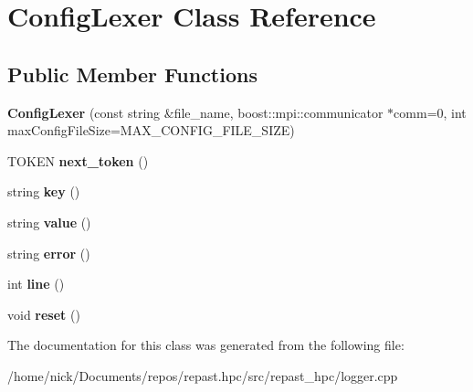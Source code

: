 \hypertarget{class_config_lexer}{\section{Config\-Lexer Class Reference}
\label{class_config_lexer}
}
\subsection*{Public Member Functions}
\begin{DoxyCompactItemize}
\item 
\hypertarget{class_config_lexer_a046cf2dcd1d747298665437b8b21ef11}{{\bfseries Config\-Lexer} (const string \&file\-\_\-name, boost\-::mpi\-::communicator $\ast$comm=0, int max\-Config\-File\-Size=M\-A\-X\-\_\-\-C\-O\-N\-F\-I\-G\-\_\-\-F\-I\-L\-E\-\_\-\-S\-I\-Z\-E)}\label{class_config_lexer_a046cf2dcd1d747298665437b8b21ef11}

\item 
\hypertarget{class_config_lexer_ac6c1e251c3db1f30c50b20b1ee7450f1}{T\-O\-K\-E\-N {\bfseries next\-\_\-token} ()}\label{class_config_lexer_ac6c1e251c3db1f30c50b20b1ee7450f1}

\item 
\hypertarget{class_config_lexer_adc9e9967c636a264708b3bf06aaf3a76}{string {\bfseries key} ()}\label{class_config_lexer_adc9e9967c636a264708b3bf06aaf3a76}

\item 
\hypertarget{class_config_lexer_abd3e04c84b9411f4232a2063fabdb6ac}{string {\bfseries value} ()}\label{class_config_lexer_abd3e04c84b9411f4232a2063fabdb6ac}

\item 
\hypertarget{class_config_lexer_a483c74b57e0ec56abdb815dc91511c51}{string {\bfseries error} ()}\label{class_config_lexer_a483c74b57e0ec56abdb815dc91511c51}

\item 
\hypertarget{class_config_lexer_adfa7ec76d67765cd52ff3c91af5f9dbd}{int {\bfseries line} ()}\label{class_config_lexer_adfa7ec76d67765cd52ff3c91af5f9dbd}

\item 
\hypertarget{class_config_lexer_a3f6909108d4b8f09b12f1c9332fc9930}{void {\bfseries reset} ()}\label{class_config_lexer_a3f6909108d4b8f09b12f1c9332fc9930}

\end{DoxyCompactItemize}


The documentation for this class was generated from the following file\-:\begin{DoxyCompactItemize}
\item 
/home/nick/\-Documents/repos/repast.\-hpc/src/repast\-\_\-hpc/logger.\-cpp\end{DoxyCompactItemize}
